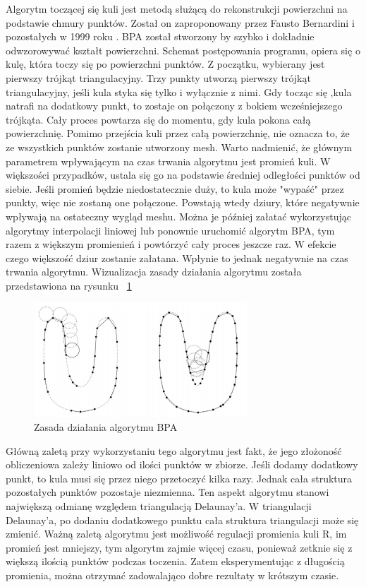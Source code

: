 Algorytm toczącej się kuli jest metodą służącą do rekonstrukcji powierzchni na podstawie chmury punktów. Został on zaproponowany przez Fausto Bernardini i pozostałych w 1999 roku \cite{bernardini1999ball}. BPA został stworzony by szybko i dokładnie odwzorowywać kształt powierzchni. Schemat postępowania programu, opiera się o kulę, która toczy się po powierzchni punktów. Z początku, wybierany jest pierwszy trójkąt triangulacyjny. Trzy punkty utworzą pierwszy trójkąt triangulacyjny, jeśli kula styka się tylko i wyłącznie z nimi. Gdy tocząc się ,kula natrafi na dodatkowy punkt, to zostaje on połączony z bokiem wcześniejszego trójkąta. Cały proces powtarza się do momentu, gdy kula pokona całą powierzchnię. Pomimo przejścia kuli przez całą powierzchnię, nie oznacza to, że ze wszystkich punktów zostanie utworzony mesh. Warto nadmienić, że głównym parametrem wpływającym na czas trwania algorytmu jest promień kuli. W większości przypadków, ustala się go na podstawie średniej odległości punktów od siebie. Jeśli promień będzie niedostatecznie duży, to kula może "wypaść" przez punkty, więc nie zostaną one połączone. Powstają wtedy dziury, które negatywnie wpływają na ostateczny wygląd meshu. Można je później załatać wykorzystując algorytmy interpolacji liniowej lub ponownie uruchomić algorytm BPA, tym razem z większym promienień i powtórzyć cały proces jeszcze raz. W efekcie czego większość dziur zostanie załatana. Wpłynie to jednak negatywnie na czas trwania algorytmu. Wizualizacja zasady działania algorytmu została przedstawiona na rysunku ~\ref{fig:bpaZasada}

\begin{figure}[H]
  \centering
  \includegraphics[scale=0.8]{bpa_zasada.PNG}
  \caption{Zasada działania algorytmu BPA \cite{bernardini1999ball}}   
  \label{fig:bpaZasada}
\end{figure}
Główną zaletą przy wykorzystaniu tego algorytmu jest fakt, że jego złożoność obliczeniowa zależy liniowo od ilości punktów w zbiorze. Jeśli dodamy dodatkowy punkt, to kula musi się przez niego przetoczyć kilka razy. Jednak cała struktura pozostałych punktów pozostaje niezmienna. Ten aspekt algorytmu stanowi największą odmianę względem triangulacją Delaunay'a. W triangulacji Delaunay'a, po dodaniu dodatkowego punktu cała struktura triangulacji może się zmienić. Ważną zaletą algorytmu jest możliwość regulacji promienia kuli R, im promień jest mniejszy, tym algorytm zajmie więcej czasu, ponieważ zetknie się z większą ilością punktów podczas toczenia. Zatem eksperymentując z długością promienia, można otrzymać zadowalająco dobre rezultaty w krótszym czasie. 



